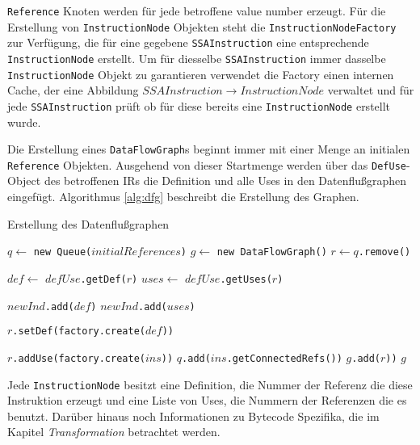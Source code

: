\texttt{Reference} Knoten werden für jede betroffene value number erzeugt. Für
die Erstellung von \texttt{InstructionNode} Objekten steht die 
\texttt{InstructionNodeFactory} zur Verfügung, die für eine gegebene 
\texttt{SSAInstruction} eine entsprechende \texttt{InstructionNode} erstellt. Um
für diesselbe \texttt{SSAInstruction} immer dasselbe \texttt{InstructionNode} 
Objekt zu garantieren verwendet die Factory einen internen Cache, der eine 
Abbildung $SSAInstruction \rightarrow InstructionNode$ verwaltet und für jede 
\texttt{SSAInstruction} prüft ob für diese bereits eine \texttt{InstructionNode} 
erstellt wurde.

Die Erstellung eines \texttt{DataFlowGraph}s beginnt immer mit einer Menge an 
initialen \texttt{Reference} Objekten. Ausgehend von dieser Startmenge werden über 
das \texttt{DefUse}-Object des betroffenen IRs die Definition und alle Uses in den 
Datenflußgraphen eingefügt. Algorithmus \ref{alg:dfg} beschreibt die Erstellung des 
Graphen.

\begin{algorithm}[H]
	\caption{Erstellung des Datenflußgraphen}\label{alg:dfg}
	\begin{algorithmic}[1]
		\STATE $q \gets$ \texttt{new Queue($initialReferences$)}
		\STATE $g \gets$ \texttt{new DataFlowGraph()}
			\STATE $r \gets q$\texttt{.remove()}

				\STATE $def \gets$ \texttt{$defUse$.getDef($r$)}
				\STATE $uses \gets$ \texttt{$defUse$.getUses($r$)}

				\STATE \texttt{$newInd$.add($def$)}
				\STATE \texttt{$newInd$.add($uses$)}

				\STATE \texttt{$r$.setDef(factory.create($def$))}

					\STATE \texttt{$r$.addUse(factory.create($ins$))}
				\ENDFOR
					\STATE \texttt{$q$.add($ins$.getConnectedRefs())}
				\ENDFOR
				\STATE \texttt{$g$.add($r$))}
			\ENDIF
		\ENDWHILE
		\RETURN $g$
	\end{algorithmic}
\end{algorithm}

Jede \texttt{InstructionNode} besitzt eine Definition, die Nummer der Referenz 
die diese Instruktion erzeugt und eine Liste von Uses, die Nummern der Referenzen 
die es benutzt. Darüber hinaus noch Informationen zu Bytecode Spezifika, die 
im Kapitel \textit{Transformation} betrachtet werden.


